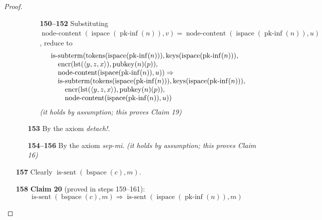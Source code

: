 \documentclass[11pt]{article}
\theoremstyle{plain}
\begin{document}
\begin{proof}
\begin{itemize}[leftmargin=2.8em, itemsep=4pt, parsep=1pt]
\begin{itemize}[leftmargin=2.8em, itemsep=4pt, parsep=1pt]
  \begin{itemize}[leftmargin=2.8em, itemsep=4pt, parsep=1pt]
  \item[\textbf{150--152}] Substituting $\operatorname{node\text{-}content}(\operatorname{ispace}(\operatorname{pk\text{-}inf}(n)), v) = \operatorname{node\text{-}content}(\operatorname{ispace}(\operatorname{pk\text{-}inf}(n)), u)$, reduce to
\begin{equation*}
\begin{array}{@{}l@{}} \operatorname{is\text{-}subterm}(\operatorname{tokens}(\operatorname{ispace}(\operatorname{pk\text{-}inf}(n))), \operatorname{keys}(\operatorname{ispace}(\operatorname{pk\text{-}inf}(n))), \\ \quad \operatorname{encr}(\operatorname{lst}(\langle y, z, x \rangle), \operatorname{pubkey}(n)(p)), \\ \quad \operatorname{node\text{-}content}(\operatorname{ispace}(\operatorname{pk\text{-}inf}(n)), u)) \Rightarrow \\ \quad \operatorname{is\text{-}subterm}(\operatorname{tokens}(\operatorname{ispace}(\operatorname{pk\text{-}inf}(n))), \operatorname{keys}(\operatorname{ispace}(\operatorname{pk\text{-}inf}(n))), \\ \quad \quad \operatorname{encr}(\operatorname{lst}(\langle y, z, x \rangle), \operatorname{pubkey}(n)(p)), \\ \quad \quad \operatorname{node\text{-}content}(\operatorname{ispace}(\operatorname{pk\text{-}inf}(n)), u)) \end{array}
\end{equation*}
  \emph{(it holds by assumption; this proves Claim 19)}
  \end{itemize}
  \item[\textbf{153}] By the axiom \emph{detach!}.
  \item[\textbf{154--156}] By the axiom \emph{sep-mi}.  \emph{(it holds by assumption; this proves Claim 16)}
  \end{itemize}
  \item[\textbf{157}] Clearly $\operatorname{is\text{-}sent}(\operatorname{bspace}(c), m)$.
  \item[\textbf{158}] \textbf{Claim 20} (proved in steps 159--161):
\begin{equation*}
\operatorname{is\text{-}sent}(\operatorname{bspace}(c), m) \Rightarrow \operatorname{is\text{-}sent}(\operatorname{ispace}(\operatorname{pk\text{-}inf}(n)), m)
\end{equation*}


\end{itemize}
\end{proof}
\end{document}
